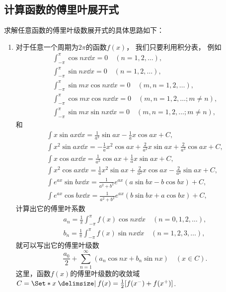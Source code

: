 \subsection*{计算函数的傅里叶展开式}
求解任意函数的傅里叶级数展开式的具体思路如下：
\begin{enumerate}
	\item 对于任意一个周期为\(2\pi\)的函数\(f(x)\)，
	我们只要利用积分表，
	例如\begin{gather*}
		\int_{-\pi}^\pi \cos{nx} \dd{x} = 0 \quad(n=1,2,\dotsc), \\
		\int_{-\pi}^\pi \sin{nx} \dd{x} = 0 \quad(n=1,2,\dotsc), \\
		\int_{-\pi}^\pi \sin{mx}\cos{nx} \dd{x} = 0 \quad(m,n=1,2,\dotsc), \\
		\int_{-\pi}^\pi \cos{mx}\cos{nx} \dd{x} = 0 \quad(m,n=1,2,\dotsc; m \neq n), \\
		\int_{-\pi}^\pi \sin{mx}\sin{nx} \dd{x} = 0 \quad(m,n=1,2,\dotsc; m \neq n),
	\end{gather*}
	和\begin{gather*}
		\int x \sin ax \dd{x}
		= \frac{1}{a^2} \sin ax - \frac{1}{a} x \cos ax + C, \\
		\int x^2 \sin ax \dd{x}
		= -\frac{1}{a} x^2\cos ax + \frac{2}{a^2} x\sin ax + \frac{2}{a^3} \cos ax + C, \\
		\int x \cos ax \dd{x}
		= \frac{1}{a^2} \cos ax + \frac{1}{a} x \sin ax + C, \\
		\int x^2 \cos ax \dd{x}
		= \frac{1}{a} x^2 \sin ax + \frac{2}{a^2} x \cos ax - \frac{2}{a^3} \sin ax + C, \\
		\int e^{ax} \sin bx \dd{x}
		= \frac{1}{a^2+b^2} e^{ax} (a \sin bx - b \cos bx) + C, \\
		\int e^{ax} \cos bx \dd{x}
		= \frac{1}{a^2+b^2} e^{ax} (b \sin bx + a \cos bx) + C,
	\end{gather*}
	计算出它的傅里叶系数\begin{gather*}
		a_n = \frac{1}{\pi} \int_{-\pi}^\pi f(x) \cos nx \dd{x}
		\quad(n=0,1,2,\dotsc), \\
		b_n = \frac{1}{\pi} \int_{-\pi}^\pi f(x) \sin nx \dd{x}
		\quad(n=1,2,3,\dotsc),
	\end{gather*}
	就可以写出它的傅里叶级数\begin{equation*}
		\frac{a_0}{2} + \sum_{n=1}^\infty (a_n \cos nx + b_n \sin nx)
		\quad(x \in C).
	\end{equation*}
	这里，函数\(f(x)\)的傅里叶级数的收敛域\(C = \Set*{
		x \given
		f(x) = \frac{1}{2} [ f(x^-) + f(x^+) ]
	}\).


\end{enumerate}
